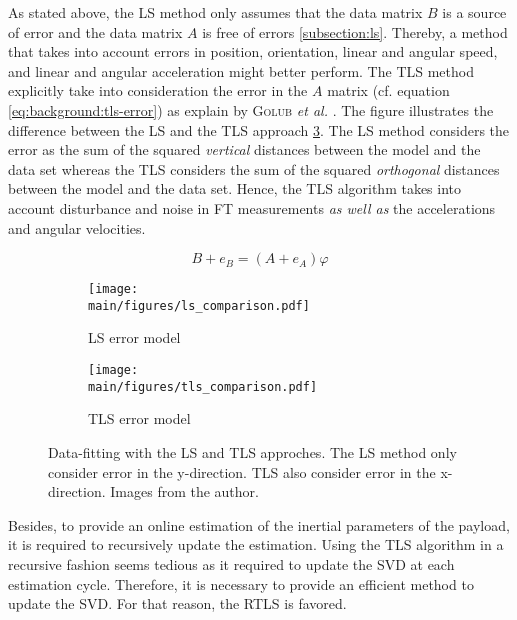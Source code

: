 \documentclass[/home/francois/latex/report/main.tex]{subfiles}
\begin{document}
As stated above, the \ac{LS} method only assumes that the data matrix $B$ is a source of error and the data matrix $A$ is free of errors \ref{subsection:ls}. Thereby, a method that takes into account errors in position, orientation, linear and angular speed, and linear and angular acceleration might better perform. The \ac{TLS} method explicitly take into consideration the error in the $A$ matrix (cf. equation \ref{eq:background:tls-error}) as explain by \textsc{Golub} \textit{et al.} \cite{Golub1980}. The figure illustrates the difference between the \ac{LS} and the \ac{TLS} approach \ref{fig:background:ls-tls-error}. The \ac{LS} method considers the error as the sum of the squared \textit{vertical} distances between the model and the data set whereas the \ac{TLS} considers the sum of the squared \textit{orthogonal} distances between the model and the data set. Hence, the \ac{TLS} algorithm takes into account disturbance and noise in \ac{FT} measurements \textit{as well as} the accelerations and angular velocities.

\begin{equation}
  \label{eq:background:tls-error}
B + e_B = (A + e_A) \varphi
\end{equation}

\begin{figure}
\centering
\begin{subfigure}{0.49\textwidth}
\centering
\texttt{[image: \\main/figures/ls\_comparison.pdf]}
\caption{\ac{LS} error model}
\label{fig:background:ls-error}
\end{subfigure}
\begin{subfigure}{0.49\textwidth}
\centering
\texttt{[image: \\main/figures/tls\_comparison.pdf]}
\caption{\ac{TLS} error model}
\label{fig:background:tls-error}
\end{subfigure}
\caption{Data-fitting with the \ac{LS} and \ac{TLS} approches. The \ac{LS} method only consider error in the y-direction. \ac{TLS} also consider error in the x-direction. Images from the author.}
\label{fig:background:ls-tls-error}
\end{figure}

Besides, to provide an online estimation of the inertial parameters of the payload, it is required to recursively update the estimation. Using the \ac{TLS} algorithm in a recursive fashion seems tedious as it required to update the \ac{SVD} at each estimation cycle. Therefore, it is necessary to provide an efficient method to update the \ac{SVD}. For that reason, the \ac{RTLS} is favored.
\end{document}
